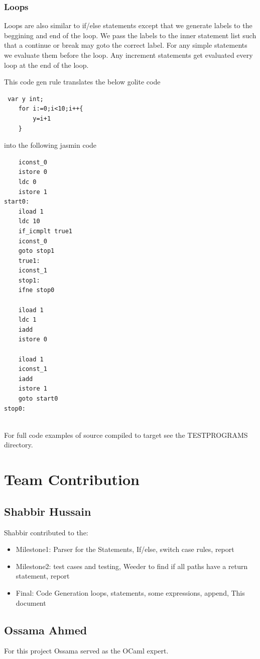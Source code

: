 \documentclass{article}
\begin{document}
\subsubsection*{Loops}
Loops are also similar to if/else statements except that we generate labels to the beggining and end of the loop. We pass the labels to the inner statement list such that a continue or break may goto the correct label. For any simple statements we evaluate them before the loop. Any increment statements get evaluated every loop at the end of the loop.

This code gen rule translates the below golite code
\begin{lstlisting}
 var y int;
    for i:=0;i<10;i++{
        y=i+1
    }

\end{lstlisting}
into the following jasmin code
\begin{lstlisting}
	iconst_0
	istore 0
	ldc 0
	istore 1
start0:
	iload 1
	ldc 10
	if_icmplt true1
	iconst_0
	goto stop1
	true1:
	iconst_1
	stop1:
	ifne stop0

	iload 1
	ldc 1
	iadd
	istore 0
	
	iload 1
	iconst_1
	iadd
	istore 1
	goto start0
stop0:


\end{lstlisting}

For full code examples of source compiled to target see the TESTPROGRAMS directory.

\section{Team Contribution}

\subsection{Shabbir Hussain}
Shabbir contributed to the:

\begin{itemize}
\item Milestone1: Parser for the Statements, If/else, switch case rules, report
\item Milestone2: test cases and testing, Weeder to find if all paths have a return statement, report
\item Final: Code Generation loops, statements, some expressions, append, This document
\end{itemize}


\subsection{Ossama Ahmed}
For this project Ossama served as the OCaml expert.
  
\end{document}
